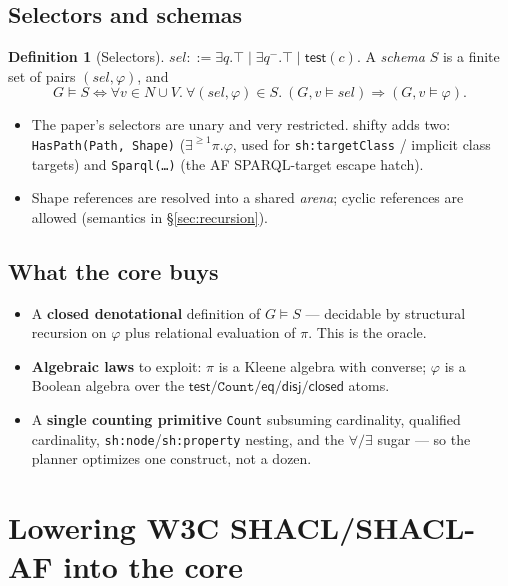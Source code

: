\documentclass[11pt]{article}
\newcommand{\Node}{N}
\newcommand{\Val}{V}
\newcommand{\conf}{\models}                       %
\newcommand{\test}{\mathsf{test}}
\newcommand{\closedc}{\mathsf{closed}}
\newcommand{\eqc}{\mathsf{eq}}
\newcommand{\disjc}{\mathsf{disj}}
\newcommand{\sel}{\mathit{sel}}
\newcommand{\code}[1]{\texttt{#1}}
\theoremstyle{definition}
\newtheorem{definition}{Definition}[section]
\begin{document}
\subsection{Selectors and schemas}

\begin{definition}[Selectors]
$\sel ::= \exists q.\top \mid \exists q^{-}.\top \mid \test(c)$. A \emph{schema}
$S$ is a finite set of pairs $(\sel,\varphi)$, and
\[
G\models S \iff \forall v\in\Node\cup\Val.\ \forall(\sel,\varphi)\in S.\ (G,v\conf\sel)\Rightarrow(G,v\conf\varphi).
\]
\end{definition}
\begin{itemize}[leftmargin=1.4em]
  \item The paper's selectors are unary and very restricted. shifty adds two:
  \code{HasPath(Path, Shape)} ($\exists^{\geq1}\pi.\varphi$, used for
  \code{sh:targetClass} / implicit class targets) and \code{Sparql(\dots)} (the
  AF SPARQL-target escape hatch).
  \item Shape references are resolved into a shared \emph{arena}; cyclic
  references are allowed (semantics in \S\ref{sec:recursion}).
\end{itemize}

\subsection{What the core buys}
\begin{itemize}[leftmargin=1.4em]
  \item A \textbf{closed denotational} definition of $G\models S$ --- decidable
  by structural recursion on $\varphi$ plus relational evaluation of $\pi$. This
  is the oracle.
  \item \textbf{Algebraic laws} to exploit: $\pi$ is a Kleene algebra with
  converse; $\varphi$ is a Boolean algebra over the
  $\test/\code{Count}/\eqc/\disjc/\closedc$ atoms.
  \item A \textbf{single counting primitive} \code{Count} subsuming cardinality,
  qualified cardinality, \code{sh:node}/\code{sh:property} nesting, and the
  $\forall/\exists$ sugar --- so the planner optimizes one construct, not a dozen.
\end{itemize}

\section{Lowering W3C SHACL/SHACL-AF into the core}\label{sec:gap}
\end{document}
